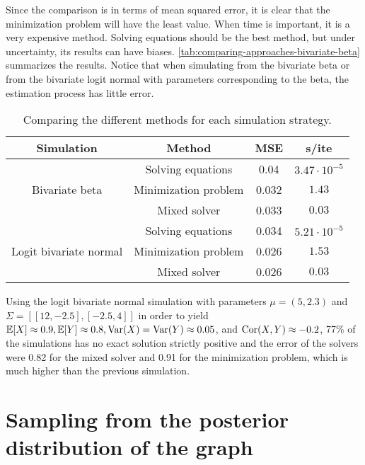 Since the comparison is in terms of mean squared error, it is clear that the
minimization problem will have the least value. When time is important, it is
a very expensive method. Solving equations should be the best method, but
under uncertainty, its results can have biases.
\autoref{tab:comparing-approaches-bivariate-beta} summarizes the results. 
Notice that when simulating from the bivariate beta or from the bivariate
logit normal with parameters corresponding to the beta, the estimation process
has little error. 

\begin{table}[hb]
  \centering
  \caption{\label{tab:comparing-approaches-bivariate-beta}Comparing the
  different methods for each simulation strategy.}
  \begin{tabular}{cccc}
  \hline
  \multicolumn{1}{c}{\textbf{Simulation}} & \textbf{Method} & \textbf{MSE} & \textbf{s/ite} \\ \hline
  \multirow{3}{*}{Bivariate beta} & Solving equations & 0.04 & $3.47 \cdot 10^{-5}$ \\
   & Minimization problem & 0.032 & $1.43$ \\
   & Mixed solver & 0.033 & $0.03$ \\
  \multirow{3}{*}{Logit bivariate normal} & Solving equations & 0.034 & $5.21 \cdot 10^{-5}$ \\
   & Minimization problem & 0.026 & $1.53$ \\
   & Mixed solver & 0.026 & $0.03$  \\ \hline
  \end{tabular}
\end{table}

Using the logit bivariate normal simulation with parameters $\mu = (5, 2.3)$
and $\Sigma = [[12, -2.5], [-2.5, 4]]$ in order to yield $\mathbb{E}[X] \approx 0.9,
\mathbb{E}[Y] \approx 0.8, \operatorname{Var}(X) = \operatorname{Var}(Y) \approx 0.05$, and $\operatorname{Cor}(X,Y) \approx
-0.2$, 77\% of the simulations has no exact solution strictly positive and the
error of the solvers were 0.82 for the mixed solver and 0.91 for the
minimization problem, which is much higher than the previous simulation.

\chapter{Sampling from the posterior distribution of the graph}
\label{sec:sampling-posterior-graph}

